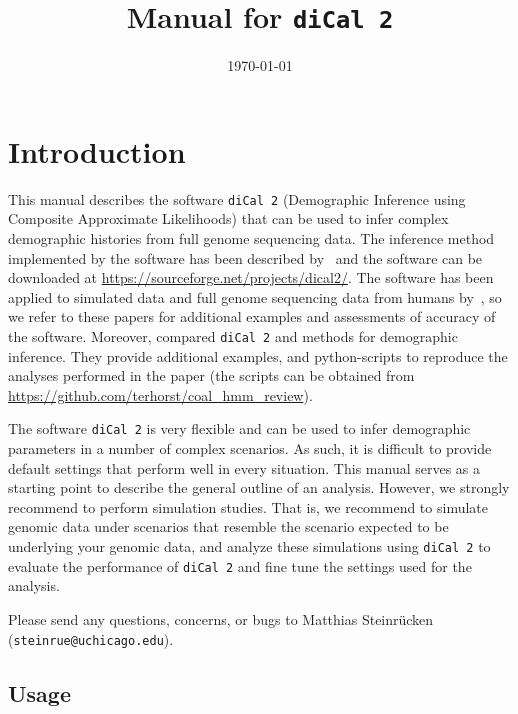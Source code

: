 \documentclass{article}
\title{Manual for \texttt{diCal 2}}
\date{\today}
\numberwithin{equation}{section}
\begin{document}
\maketitle 

\tableofcontents

\section{Introduction}

This manual describes the software \texttt{diCal 2} (Demographic Inference using Composite Approximate Likelihoods) that can be used to infer complex demographic histories from full genome sequencing data. The inference method implemented by the software has been described by~\cite{Steinruecken2019} and the software can be downloaded at \url{https://sourceforge.net/projects/dical2/}. The software has been applied to simulated data and full genome sequencing data from humans by~\cite{Raghavan2015,Moreno2018b,Steinruecken2019}, so we refer to these papers for additional examples and assessments of accuracy of the software. Moreover, \cite{Spence2018} compared \texttt{diCal 2} and methods for demographic inference. They provide additional examples, and python-scripts to reproduce the analyses performed in the paper (the scripts can be obtained from \url{https://github.com/terhorst/coal_hmm_review}).

The software \texttt{diCal 2} is very flexible and can be used to infer demographic parameters in a number of complex scenarios. As such, it is difficult to provide default settings that perform well in every situation. This manual serves as a starting point to describe the general outline of an analysis. However, we strongly recommend to perform simulation studies. That is, we recommend to simulate genomic data under scenarios that resemble the scenario expected to be underlying your genomic data, and analyze these simulations using \texttt{diCal 2} to evaluate the performance of \texttt{diCal 2} and fine tune the settings used for the analysis.

Please send any questions, concerns, or bugs to Matthias Steinrücken (\texttt{steinrue@uchicago.edu}).

\subsection{Usage}
\end{document}
